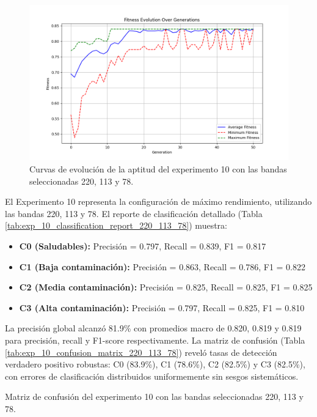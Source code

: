 \begin{figure}[ht]
\centering
\includegraphics[width=\textwidth]{images/exp_10_fitness_evolution.png}
\caption{Curvas de evolución de la aptitud del experimento 10 con las bandas seleccionadas 220, 113 y 78.}
\label{fig:exp_10_fitness_evolution}
\end{figure}

El Experimento 10 representa la configuración de máximo rendimiento, utilizando las bandas 220, 113 y 78. El reporte de clasificación detallado (Tabla \ref{tab:exp_10_classification_report_220_113_78}) muestra:

\begin{itemize} \item \textbf{C0 (Saludables):} Precisión = 0.797, Recall = 0.839, F1 = 0.817 \item \textbf{C1 (Baja contaminación):} Precisión = 0.863, Recall = 0.786, F1 = 0.822 \item \textbf{C2 (Media contaminación):} Precisión = 0.825, Recall = 0.825, F1 = 0.825 \item \textbf{C3 (Alta contaminación):} Precisión = 0.797, Recall = 0.825, F1 = 0.810 \end{itemize}

La precisión global alcanzó 81.9\% con promedios macro de 0.820, 0.819 y 0.819 para precisión, recall y F1-score respectivamente. La matriz de confusión (Tabla \ref{tab:exp_10_confusion_matrix_220_113_78}) reveló tasas de detección verdadero positivo robustas: C0 (83.9\%), C1 (78.6\%), C2 (82.5\%) y C3 (82.5\%), con errores de clasificación distribuidos uniformemente sin sesgos sistemáticos.

\begin{table}[ht]
\centering
\caption{Matriz de confusión del experimento 10 con las bandas seleccionadas 220, 113 y 78.}
\label{tab:exp_10_confusion_matrix_220_113_78}
\end{table}

